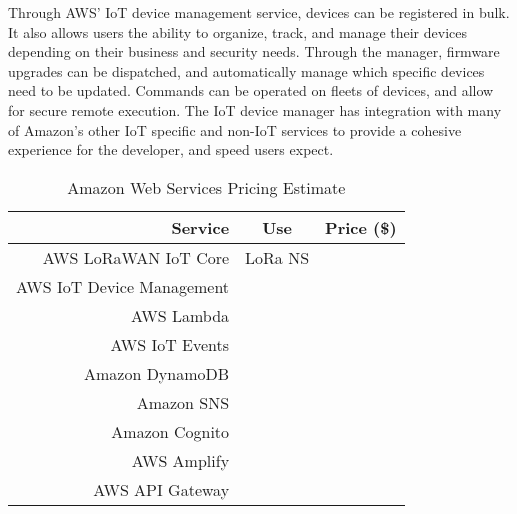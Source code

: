 Through AWS' IoT device management service, devices can be registered in bulk. It also allows users
the ability to organize, track, and manage their devices depending on their business and security
needs. Through the manager, firmware upgrades can be dispatched, and automatically manage which
specific devices need to be updated. Commands can be operated on fleets of devices, and allow for
secure remote execution. The IoT device manager has integration with many of Amazon's other IoT
specific and non-IoT services to provide a cohesive experience for the developer, and speed users
expect.

\begin{table}[H]
\centering\scriptsize
\caption{Amazon Web Services Pricing Estimate}
\begin{tabular}{|r|c|c|}
\hline
Service & Use & Price (\$)\\
\hline\hline

AWS LoRaWAN IoT Core & LoRa NS & \\\hline
AWS IoT Device Management & & \\\hline
AWS Lambda & & \\\hline
AWS IoT Events & & \\\hline
Amazon DynamoDB & & \\\hline
Amazon SNS & & \\\hline
Amazon Cognito & & \\\hline
AWS Amplify & & \\\hline
AWS API Gateway & & \\\hline

\end{tabular}
\label{tbl:aws-pricing}
\end{table}

